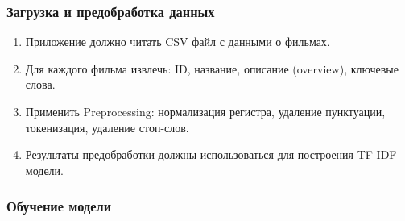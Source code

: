 \subsubsection*{Загрузка и предобработка данных}

\begin{enumerate}
    \item Приложение должно читать CSV файл с данными о фильмах.
    \item Для каждого фильма извлечь: ID, название, описание (overview), ключевые слова.
    \item Применить Preprocessing: нормализация регистра, удаление пунктуации, токенизация, удаление стоп-слов.
    \item Результаты предобработки должны использоваться для построения TF-IDF модели.
\end{enumerate}

\subsubsection*{Обучение модели}

